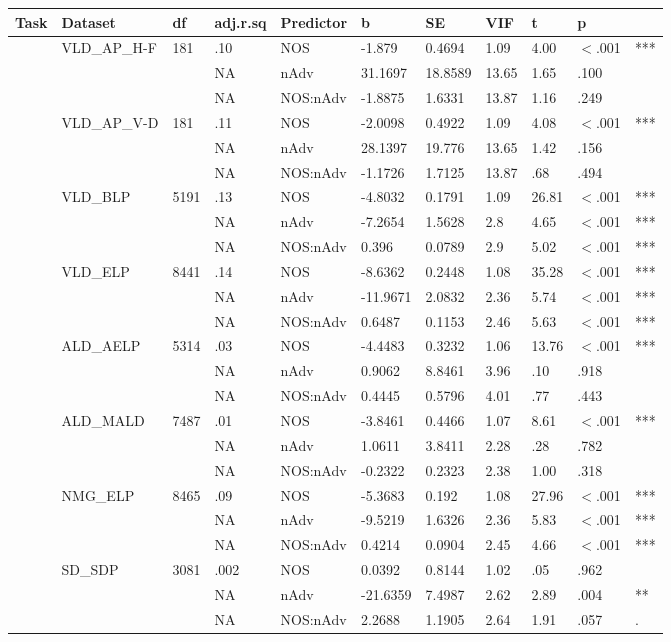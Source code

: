 \begin{table}[ht]
\centering
\begingroup\normalsize
\begin{tabular}{lllllllllll}
  \hline
Task & Dataset & df & adj.r.sq & Predictor & b & SE & VIF & t & p &  \\ 
  \hline
 & VLD\_AP\_H-F & 181 & .10 & NOS & -1.879 & 0.4694 & 1.09 & 4.00 & $<$.001 & *** \\ 
   &  &  & NA & nAdv & 31.1697 & 18.8589 & 13.65 & 1.65 & .100 &   \\ 
   &  &  & NA & NOS:nAdv & -1.8875 & 1.6331 & 13.87 & 1.16 & .249 &   \\ 
   & VLD\_AP\_V-D & 181 & .11 & NOS & -2.0098 & 0.4922 & 1.09 & 4.08 & $<$.001 & *** \\ 
   &  &  & NA & nAdv & 28.1397 & 19.776 & 13.65 & 1.42 & .156 &   \\ 
   &  &  & NA & NOS:nAdv & -1.1726 & 1.7125 & 13.87 & .68 & .494 &   \\ 
   & VLD\_BLP & 5191 & .13 & NOS & -4.8032 & 0.1791 & 1.09 & 26.81 & $<$.001 & *** \\ 
   &  &  & NA & nAdv & -7.2654 & 1.5628 & 2.8 & 4.65 & $<$.001 & *** \\ 
   &  &  & NA & NOS:nAdv & 0.396 & 0.0789 & 2.9 & 5.02 & $<$.001 & *** \\ 
   & VLD\_ELP & 8441 & .14 & NOS & -8.6362 & 0.2448 & 1.08 & 35.28 & $<$.001 & *** \\ 
   &  &  & NA & nAdv & -11.9671 & 2.0832 & 2.36 & 5.74 & $<$.001 & *** \\ 
   &  &  & NA & NOS:nAdv & 0.6487 & 0.1153 & 2.46 & 5.63 & $<$.001 & *** \\ 
   & ALD\_AELP & 5314 & .03 & NOS & -4.4483 & 0.3232 & 1.06 & 13.76 & $<$.001 & *** \\ 
   &  &  & NA & nAdv & 0.9062 & 8.8461 & 3.96 & .10 & .918 &   \\ 
   &  &  & NA & NOS:nAdv & 0.4445 & 0.5796 & 4.01 & .77 & .443 &   \\ 
   & ALD\_MALD & 7487 & .01 & NOS & -3.8461 & 0.4466 & 1.07 & 8.61 & $<$.001 & *** \\ 
   &  &  & NA & nAdv & 1.0611 & 3.8411 & 2.28 & .28 & .782 &   \\ 
   &  &  & NA & NOS:nAdv & -0.2322 & 0.2323 & 2.38 & 1.00 & .318 &   \\ 
   & NMG\_ELP & 8465 & .09 & NOS & -5.3683 & 0.192 & 1.08 & 27.96 & $<$.001 & *** \\ 
   &  &  & NA & nAdv & -9.5219 & 1.6326 & 2.36 & 5.83 & $<$.001 & *** \\ 
   &  &  & NA & NOS:nAdv & 0.4214 & 0.0904 & 2.45 & 4.66 & $<$.001 & *** \\ 
   & SD\_SDP & 3081 & .002 & NOS & 0.0392 & 0.8144 & 1.02 & .05 & .962 &   \\ 
   &  &  & NA & nAdv & -21.6359 & 7.4987 & 2.62 & 2.89 & .004 & ** \\ 
   &  &  & NA & NOS:nAdv & 2.2688 & 1.1905 & 2.64 & 1.91 & .057 & . \\ 
   \hline
\end{tabular}
\endgroup
\end{table}
